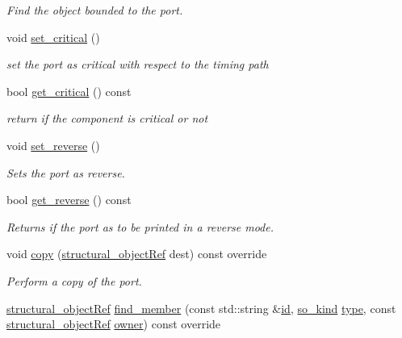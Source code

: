 \begin{DoxyCompactItemize}
\begin{DoxyCompactList}\small\item\em Find the object bounded to the port. \end{DoxyCompactList}\item 
void \hyperlink{structport__o_ace6f1d0e9d1cf5593fcdc6e5f17965de}{set\+\_\+critical} ()
\begin{DoxyCompactList}\small\item\em set the port as critical with respect to the timing path \end{DoxyCompactList}\item 
bool \hyperlink{structport__o_a475699aaee28f3ae25db250091542a2b}{get\+\_\+critical} () const
\begin{DoxyCompactList}\small\item\em return if the component is critical or not \end{DoxyCompactList}\item 
void \hyperlink{structport__o_a278864c3e3b7fd9b6821e7d8346d8209}{set\+\_\+reverse} ()
\begin{DoxyCompactList}\small\item\em Sets the port as reverse. \end{DoxyCompactList}\item 
bool \hyperlink{structport__o_ae67edaf278daf791ec69b9eb59f5f2df}{get\+\_\+reverse} () const
\begin{DoxyCompactList}\small\item\em Returns if the port as to be printed in a reverse mode. \end{DoxyCompactList}\item 
void \hyperlink{structport__o_a6450d734ab8d67ff5ab6305a09e95a7e}{copy} (\hyperlink{structural__objects_8hpp_a8ea5f8cc50ab8f4c31e2751074ff60b2}{structural\+\_\+object\+Ref} dest) const override
\begin{DoxyCompactList}\small\item\em Perform a copy of the port. \end{DoxyCompactList}\item 
\hyperlink{structural__objects_8hpp_a8ea5f8cc50ab8f4c31e2751074ff60b2}{structural\+\_\+object\+Ref} \hyperlink{structport__o_a4a8b1daac79a77d3196a10e8a297a2ce}{find\+\_\+member} (const std\+::string \&\hyperlink{classstructural__object_a841a75f6e349ff7c1987dc92d4ac33a6}{id}, \hyperlink{structural__objects_8hpp_acf52399aecacb7952e414c5746ce6439}{so\+\_\+kind} \hyperlink{classstructural__object_a9a7159ce4c8da9984f256d9032f49778}{type}, const \hyperlink{structural__objects_8hpp_a8ea5f8cc50ab8f4c31e2751074ff60b2}{structural\+\_\+object\+Ref} \hyperlink{classstructural__object_a3e96b3e00b8a78adfc44872d82e186ea}{owner}) const override

\end{DoxyCompactItemize}
